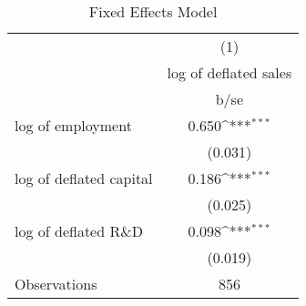 \begin{table}[htbp]\centering
\def\sym#1{\ifmmode^{#1}\else\(^{#1}\)\fi}
\caption{Fixed Effects Model}
\begin{tabular}{l*{1}{c}}
\toprule
                    &\multicolumn{1}{c}{(1)}\\
                    &\multicolumn{1}{c}{log of deflated sales}\\
                    &        b/se         \\
\midrule
log of employment   &       0.650\sym{***}\\
                    &     (0.031)         \\
log of deflated capital&       0.186\sym{***}\\
                    &     (0.025)         \\
log of deflated R\&D &       0.098\sym{***}\\
                    &     (0.019)         \\
\midrule
Observations        &         856         \\
\bottomrule
\end{tabular}
\end{table}
